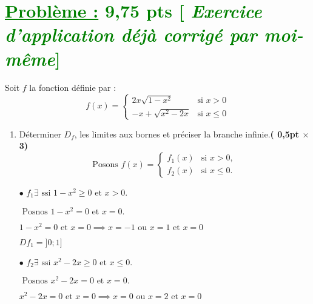 \documentclass[12pt,a4paper]{article}
\begin{document}
\section*{\textcolor{green}{\underline{Problème :} 9,75 pts [\textit{ Exercice d'application déjà corrigé par moi-même}]}}
Soit $f$ la fonction définie par :
\[
f(x) =
\begin{cases} 
2x\sqrt{1 - x^2} & \text{si } x > 0 \\ 
-x + \sqrt{x^2 - 2x} & \text{si } x \leq 0 
\end{cases}
\]
\begin{enumerate}
\item Déterminer $D_f$, les limites aux bornes et préciser la branche infinie.\hfill \textbf{( 0,5pt $\times$ 3)}
\[\text{Posons }
f(x) =
\begin{cases} 
f_1(x) & \text{si } x > 0, \\ 
f_2(x) & \text{si } x \leq 0.
\end{cases}
\]

\( \bullet \) \(f_1 \exists \text{ ssi } 1 - x^2 \geq 0 \text{ et } x > 0. \)

\(\text{ Posnos } 1 - x^2 = 0 \text{ et } x = 0. \)

\( 1 - x^2 = 0 \text{ et } x = 0 \implies x = -1 \text{ ou } x = 1 \text{ et } x = 0 \)

    
    \underline{\( Df_1 = ]0;1] \)}
    
\( \bullet \) \(f_2 \exists \text{ ssi } x^2 - 2x \geq 0 \text{ et } x \leq 0. \) 

\(\text{ Posnos } x^2 - 2x = 0 \text{ et } x = 0. \)

\( x^2 - 2x = 0 \text{ et } x = 0 \implies x = 0 \text{ ou } x = 2 \text{ et } x = 0 \)  

    

\end{enumerate}
\end{document}
